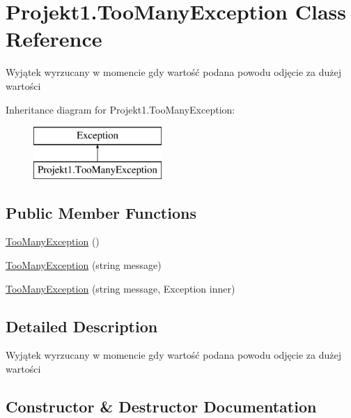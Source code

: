 \hypertarget{class_projekt1_1_1_too_many_exception}{}\section{Projekt1.\+Too\+Many\+Exception Class Reference}
\label{class_projekt1_1_1_too_many_exception}


Wyjątek wyrzucany w momencie gdy wartość podana powodu odjęcie za dużej wartości  


Inheritance diagram for Projekt1.\+Too\+Many\+Exception\+:\begin{figure}[H]
\begin{center}
\leavevmode
\includegraphics[height=2.000000cm]{class_projekt1_1_1_too_many_exception}
\end{center}
\end{figure}
\subsection*{Public Member Functions}
\begin{DoxyCompactItemize}
\item 
\mbox{\hyperlink{class_projekt1_1_1_too_many_exception_a4552a5a9b32ade2228f3c1501fb4610c}{Too\+Many\+Exception}} ()
\item 
\mbox{\hyperlink{class_projekt1_1_1_too_many_exception_af034f5bbeab7d17ce66c25a9ec10a9a3}{Too\+Many\+Exception}} (string message)
\item 
\mbox{\hyperlink{class_projekt1_1_1_too_many_exception_a12854ed0fecd600153f26fb474e99b88}{Too\+Many\+Exception}} (string message, Exception inner)
\end{DoxyCompactItemize}


\subsection{Detailed Description}
Wyjątek wyrzucany w momencie gdy wartość podana powodu odjęcie za dużej wartości 



\subsection{Constructor \& Destructor Documentation}
\mbox{\label{class_projekt1_1_1_too_many_exception_a4552a5a9b32ade2228f3c1501fb4610c}} 
